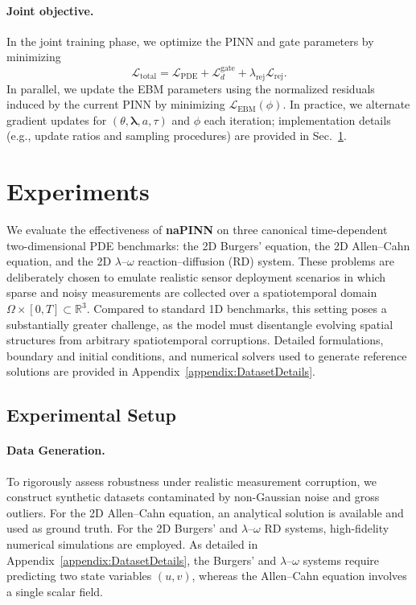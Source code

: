\documentclass{article}
\theoremstyle{plain}
\theoremstyle{definition}
\theoremstyle{remark}
\begin{document}
\paragraph{Joint objective.}
In the joint training phase, we optimize the PINN and gate parameters by minimizing
\begin{equation}
\mathcal{L}_{\text{total}}
= \mathcal{L}_{\text{PDE}}
+ \mathcal{L}_{d}^{\text{gate}}
+ \lambda_{\text{rej}}\mathcal{L}_{\text{rej}}.
\label{eq:joint_pinn_gate}
\end{equation}
In parallel, we update the EBM parameters using the normalized residuals induced by the current PINN by minimizing $\mathcal{L}_{\text{EBM}}(\phi)$.
In practice, we alternate gradient updates for $(\theta,\boldsymbol{\lambda},a,\tau)$ and $\phi$ each iteration; implementation details (e.g., update ratios and sampling procedures) are provided in Sec.~\ref{sec:experiments}.


\section{Experiments}
\label{sec:experiments}

We evaluate the effectiveness of \textbf{naPINN} on three canonical time-dependent two-dimensional PDE benchmarks: the 2D Burgers' equation, the 2D Allen--Cahn equation, and the 2D $\lambda$--$\omega$ reaction--diffusion (RD) system. These problems are deliberately chosen to emulate realistic sensor deployment scenarios in which sparse and noisy measurements are collected over a spatiotemporal domain $\Omega \times [0, T] \subset \mathbb{R}^3$. Compared to standard 1D benchmarks, this setting poses a substantially greater challenge, as the model must disentangle evolving spatial structures from arbitrary spatiotemporal corruptions. Detailed formulations, boundary and initial conditions, and numerical solvers used to generate reference solutions are provided in Appendix~\ref{appendix:DatasetDetails}.

\subsection{Experimental Setup}

\paragraph{Data Generation.} To rigorously assess robustness under realistic measurement corruption, we construct synthetic datasets contaminated by non-Gaussian noise and gross outliers. For the 2D Allen--Cahn equation, an analytical solution is available and used as ground truth. For the 2D Burgers' and $\lambda$--$\omega$ RD systems, high-fidelity numerical simulations are employed. As detailed in Appendix~\ref{appendix:DatasetDetails}, the Burgers' and $\lambda$--$\omega$ systems require predicting two state variables $(u, v)$, whereas the Allen--Cahn equation involves a single scalar field.
\end{document}
